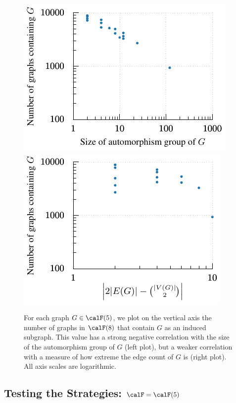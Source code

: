 \begin{figure}[htb]
    \centering

      \includegraphics*{15-universal-graphs/img/automorphisms-scatter.pdf}
     \qquad
      \includegraphics*{15-universal-graphs/img/deg-scatter.pdf}
    \caption{For each graph $G \in \calF(5)$, we plot on the vertical axis
    the number of graphs in $\calF(8)$ that contain $G$ as an induced subgraph.
    This value has a strong negative correlation with the size of the automorphism
    group of $G$ (left plot), but a weaker correlation with a measure of how
    extreme the edge count of $G$ is (right plot).
    All axis scales are logarithmic.}
\label{fig:scatter}
\end{figure}

\subsection{Testing the Strategies: $\calF = \calF(5)$}

